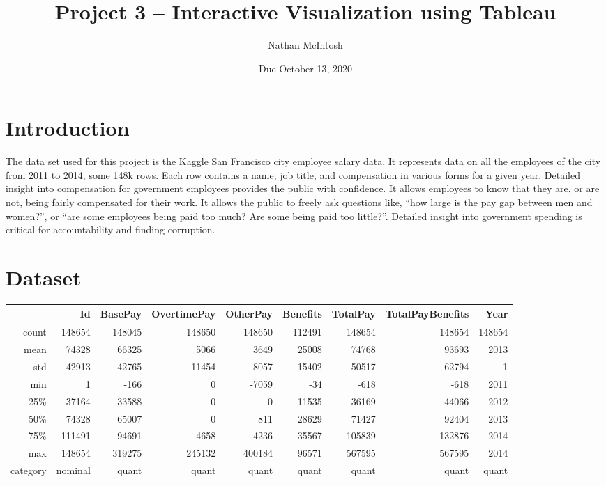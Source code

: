 \documentclass{article}
\title{Project 3 – Interactive Visualization using Tableau}
\author{Nathan McIntosh}
\date{Due October 13, 2020}
\begin{document}
\maketitle

\section{Introduction}
The data set used for this project is the Kaggle \href{https://www.kaggle.com/kaggle/sf-salaries}{San Francisco city employee salary data}. It represents data on all the employees of the city from 2011 to 2014, some 148k rows. Each row contains a name, job title, and compensation in various forms for a given year. Detailed insight into compensation for government employees provides the public with confidence. It allows employees to know that they are, or are not, being fairly compensated for their work. It allows the public to freely ask questions like, ``how large is the pay gap between men and women?'', or ``are some employees being paid too much? Are some being paid too little?''. Detailed insight into government spending is critical for accountability and finding corruption. 
\section{Dataset}

\begin{table}[ht!]
\centering
\begin{tabular}{@{}rrrrrrrrr@{}}
\toprule
      & Id     & BasePay & OvertimePay & OtherPay & Benefits & TotalPay & TotalPayBenefits & Year   \\ \midrule
count & 148654 & 148045  & 148650      & 148650   & 112491   & 148654   & 148654           & 148654 \\
mean  & 74328  & 66325   & 5066        & 3649     & 25008    & 74768    & 93693            & 2013   \\
std   & 42913  & 42765   & 11454       & 8057     & 15402    & 50517    & 62794            & 1      \\
min   & 1      & -166    & 0           & -7059    & -34      & -618     & -618             & 2011   \\
25\%  & 37164  & 33588   & 0           & 0        & 11535    & 36169    & 44066            & 2012   \\
50\%  & 74328  & 65007   & 0           & 811      & 28629    & 71427    & 92404            & 2013   \\
75\%  & 111491 & 94691   & 4658        & 4236     & 35567    & 105839   & 132876           & 2014   \\
max   & 148654 & 319275  & 245132      & 400184   & 96571    & 567595   & 567595           & 2014   \\
category & nominal & quant & quant & quant & quant & quant & quant     & quant \\ \bottomrule
\end{tabular}
\end{table}
\end{document}

